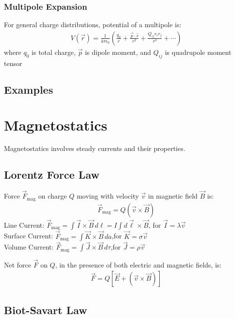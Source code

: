 \documentclass[12pt, a4paper]{article}
\begin{document}
\begin{multicols*}{3}
\subsubsection{Multipole Expansion}
For general charge distributions, potential of a multipole is:
\begin{align*}
  V(\vec{r}) = \frac{1}{4\pi\epsilon_0}\left(\frac{q_0}{r}+ \frac{\vec{p}\cdot \hat{r}}{r^2} + \frac{Q_{ij}r_ir_j}{r^3}+\cdots\right)
\end{align*}
where $q_0$ is total charge, $\vec{p}$ is dipole moment, and $Q_{ij}$ is quadrupole moment tensor

\colbreak
\subsection{Examples}

\colbreak
\colbreak
\section{Magnetostatics}
Magnetostatics involves steady currents and their properties.

\subsection{Lorentz Force Law}
Force $\vec{F}_{\text{mag}}$ on charge $Q$ moving with velocity $\vec v$ in magnetic field $\vec B$ is:
\begin{align*}
  \vec{F}_{\text{mag}} = Q(\vec{v} \times \vec{B})
\end{align*}
Line Current: $\displaystyle \vec{F}_{\text{mag}} = \int \vec{I} \times \vec{B} \, d\ell = I \int d \vec{\ell} \times \vec{B}$, for $\vec{I} = \lambda \vec{v}$\\ 
Surface Current: $\displaystyle \vec{F}_{\text{mag}} = \int \vec{K} \times \vec{B} \, da$,\quad for $\vec{K} = \sigma \vec{v}$\\ 
Volume Current: $\displaystyle \vec{F}_{\text{mag}} = \int \vec{J} \times \vec{B} \, d\tau$,\quad for $\vec{J} = \rho \vec{v}$

Net force $\vec{F}$ on $Q$, in the presence of both electric and magnetic fields, is:
\begin{align*}
  \vec{F} = Q[\vec{E} + (\vec{v}\times \vec{B})]
\end{align*}


\subsection{Biot-Savart Law}


\end{multicols*}
\end{document}
